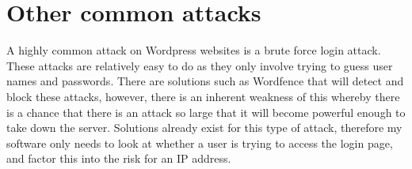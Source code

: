 
\section{Other common attacks} \label{attack3}
A highly common attack on Wordpress websites is a brute force login attack. These attacks are relatively easy to do as they only involve trying to guess user names and passwords. There are solutions such as Wordfence that will detect and block these attacks, however, there is an inherent weakness of this whereby there is a chance that there is an attack so large that it will become powerful enough to take down the server. Solutions already exist for this type of attack, therefore my software only needs to look at whether a user is trying to access the login page, and factor this into the risk for an IP address.